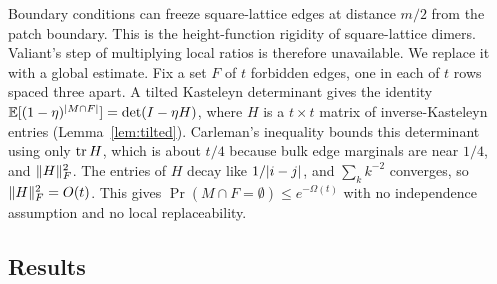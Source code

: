 Boundary conditions can freeze square-lattice edges at distance $m/2$ from the patch boundary. This is the height-function rigidity of square-lattice dimers. Valiant's step of multiplying local ratios is therefore unavailable. We replace it with a global estimate. Fix a set $F$ of $t$ forbidden edges, one in each of $t$ rows spaced three apart. A tilted Kasteleyn determinant gives the identity $\mathbb{E}[(1-\eta)^{\lvert M\cap F\rvert}]=\det(I-\eta H)$, where $H$ is a $t\times t$ matrix of inverse-Kasteleyn entries (Lemma~\ref{lem:tilted}). Carleman's inequality bounds this determinant using only $\operatorname{tr} H$, which is about $t/4$ because bulk edge marginals are near $1/4$, and $\lVert H\rVert_F^2$. The entries of $H$ decay like $1/\lvert i-j\rvert$, and $\sum_k k^{-2}$ converges, so $\lVert H\rVert_F^2=O(t)$. This gives $\Pr(M\cap F=\emptyset)\le e^{-\Omega(t)}$ with no independence assumption and no local replaceability.

\subsection{Results}\label{sec:intro-results}

